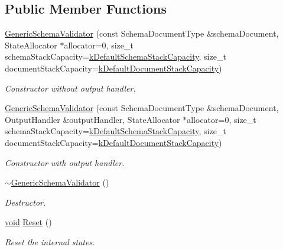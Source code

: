 \subsection*{Public Member Functions}
\begin{DoxyCompactItemize}
\item 
\hyperlink{classGenericSchemaValidator_a202ee6fdbe5ae9eab3e77a81ecdfeb6d}{Generic\+Schema\+Validator} (const Schema\+Document\+Type \&schema\+Document, State\+Allocator $\ast$allocator=0, size\+\_\+t schema\+Stack\+Capacity=\hyperlink{classGenericSchemaValidator_aab8510602779c91bc5b55ea81fd7385b}{k\+Default\+Schema\+Stack\+Capacity}, size\+\_\+t document\+Stack\+Capacity=\hyperlink{classGenericSchemaValidator_a0052a86778575179422064167a95c405}{k\+Default\+Document\+Stack\+Capacity})
\begin{DoxyCompactList}\small\item\em Constructor without output handler. \end{DoxyCompactList}\item 
\hyperlink{classGenericSchemaValidator_ac2027be8ca55b01cd6f38b45f4e233b4}{Generic\+Schema\+Validator} (const Schema\+Document\+Type \&schema\+Document, Output\+Handler \&output\+Handler, State\+Allocator $\ast$allocator=0, size\+\_\+t schema\+Stack\+Capacity=\hyperlink{classGenericSchemaValidator_aab8510602779c91bc5b55ea81fd7385b}{k\+Default\+Schema\+Stack\+Capacity}, size\+\_\+t document\+Stack\+Capacity=\hyperlink{classGenericSchemaValidator_a0052a86778575179422064167a95c405}{k\+Default\+Document\+Stack\+Capacity})
\begin{DoxyCompactList}\small\item\em Constructor with output handler. \end{DoxyCompactList}\item 
\hyperlink{classGenericSchemaValidator_a3eab83d483a50efb0c0390adf3291963}{$\sim$\+Generic\+Schema\+Validator} ()
\begin{DoxyCompactList}\small\item\em Destructor. \end{DoxyCompactList}\item 
\hyperlink{imgui__impl__opengl3__loader_8h_ac668e7cffd9e2e9cfee428b9b2f34fa7}{void} \hyperlink{classGenericSchemaValidator_a49efbbe098cb77728be3d48cafed17e4}{Reset} ()
\begin{DoxyCompactList}\small\item\em Reset the internal states. \end{DoxyCompactList}\item 

\end{DoxyCompactItemize}

